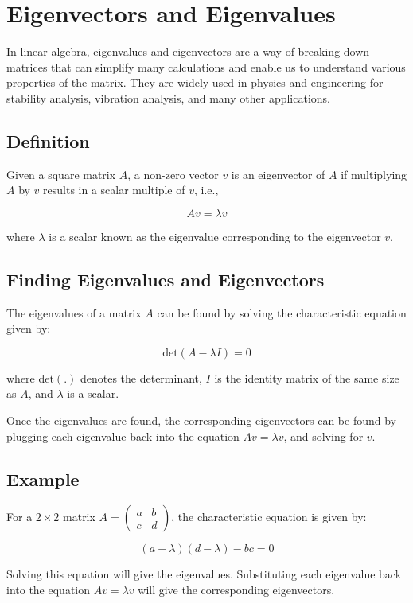 \chapter{Eigenvectors and Eigenvalues}

In linear algebra, eigenvalues and eigenvectors are a way of breaking
down matrices that can simplify many calculations and enable us to
understand various properties of the matrix. They are widely used in
physics and engineering for stability analysis, vibration analysis,
and many other applications. 

\section{Definition}

Given a square matrix $A$, a non-zero vector $v$ is an eigenvector of
$A$ if multiplying $A$ by $v$ results in a scalar multiple of $v$,
i.e.,

\begin{equation}
Av = \lambda v
\end{equation}

where $\lambda$ is a scalar known as the eigenvalue corresponding to the eigenvector $v$.

\section{Finding Eigenvalues and Eigenvectors}

The eigenvalues of a matrix $A$ can be found by solving the characteristic equation given by:

\begin{equation}
\text{det}(A - \lambda I) = 0
\end{equation}

where $\text{det}(.)$ denotes the determinant, $I$ is the identity
matrix of the same size as $A$, and $\lambda$ is a scalar.

Once the eigenvalues are found, the corresponding eigenvectors can be
found by plugging each eigenvalue back into the equation $Av = \lambda
v$, and solving for $v$.

\section{Example}

For a $2 \times 2$ matrix $A = \begin{pmatrix} a & b \\ c &
  d \end{pmatrix}$, the characteristic equation is given by:

\begin{equation}
(a - \lambda)(d - \lambda) - bc = 0
\end{equation}

Solving this equation will give the eigenvalues. Substituting each
eigenvalue back into the equation $Av = \lambda v$ will give the
corresponding eigenvectors.

